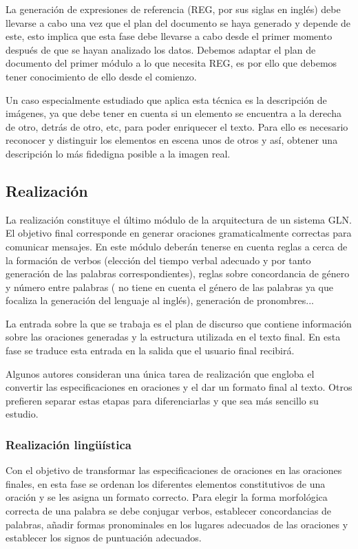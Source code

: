 La generación de expresiones de referencia (REG, por sus siglas en inglés) debe llevarse a cabo una vez que el plan del documento se haya generado y depende de este, esto implica que esta fase debe llevarse a cabo desde el primer momento después de que se hayan analizado los datos. Debemos adaptar el plan de documento del primer módulo a lo que necesita REG, es por ello que debemos tener conocimiento de ello desde el comienzo.

Un caso especialmente estudiado que aplica esta técnica es la descripción de imágenes, ya que debe tener en cuenta si un elemento se encuentra a la derecha de otro, detrás de otro, etc, para poder enriquecer el texto. Para ello es necesario reconocer y distinguir los elementos en escena unos de otros y así, obtener una descripción lo más fidedigna posible a la imagen real.

\subsection{Realización}
La realización constituye el último módulo de la arquitectura de un sistema GLN. El objetivo final corresponde en generar oraciones gramaticalmente correctas para comunicar mensajes. En este módulo deberán tenerse en cuenta reglas a cerca de la formación de verbos (elección del tiempo verbal adecuado y por tanto generación de las palabras correspondientes), reglas sobre concordancia de género y número entre palabras (\cite{reiter1997building} no tiene en cuenta el género de las palabras ya que focaliza la generación del lenguaje al inglés), generación de pronombres...
 
La entrada sobre la que se trabaja es el plan de discurso que contiene información sobre las oraciones generadas y la estructura utilizada en el texto final. En esta fase se traduce esta entrada en la salida que el usuario final recibirá.

Algunos autores consideran una única tarea de realización que engloba el convertir las especificaciones en oraciones y el dar un formato final al texto. Otros prefieren separar estas etapas para diferenciarlas y que sea más sencillo su estudio.

\subsubsection{Realización lingüística}
Con el objetivo de transformar las especificaciones de oraciones en las oraciones finales, en esta fase se ordenan los diferentes elementos constitutivos de una oración y se les asigna un formato correcto. Para elegir la forma morfológica correcta de una palabra se debe conjugar verbos, establecer concordancias de palabras, añadir formas pronominales en los lugares adecuados de las oraciones y establecer los signos de puntuación adecuados. 

